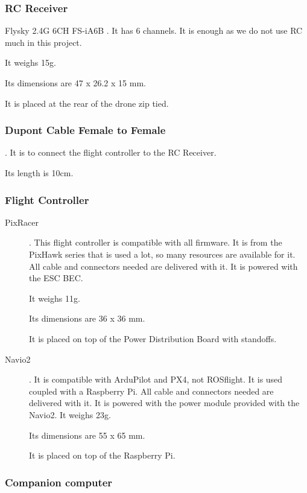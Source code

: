 \subsubsection{RC Receiver}
Flysky 2.4G 6CH FS-iA6B \cite{bangood_receiver}. It has 6 channels. It is enough as we do not use RC much in this project.

It weighs 15g.

Its dimensions are 47 x 26.2 x 15 mm.

It is placed at the rear of the drone zip tied.

\subsubsection{Dupont Cable Female to Female}
\cite{bangood_dupont_cable}. It is to connect the flight controller to the RC Receiver.

Its length is 10cm.

\subsubsection{Flight Controller}
\begin{description}
    \item[PixRacer] \cite{mrobotics_pixracer}. This flight controller is compatible with all firmware. It is from the PixHawk series that is used a lot, so many resources are available for it. All cable and connectors needed are delivered with it. It is powered with the ESC BEC.

          It weighs 11g.

          Its dimensions are 36 x 36 mm.

          It is placed on top of the Power Distribution Board with standoffs.

    \item[Navio2] \cite{emlid_navio2}. It is compatible with ArduPilot and PX4, not ROSflight. It is used coupled with a Raspberry Pi. All cable and connectors needed are delivered with it. It is powered with the power module \cite{emlid_power_module} provided with the Navio2.
          It weighs 23g.

          Its dimensions are 55 x 65 mm.

          It is placed on top of the Raspberry Pi.
\end{description}

\subsubsection{Companion computer}

